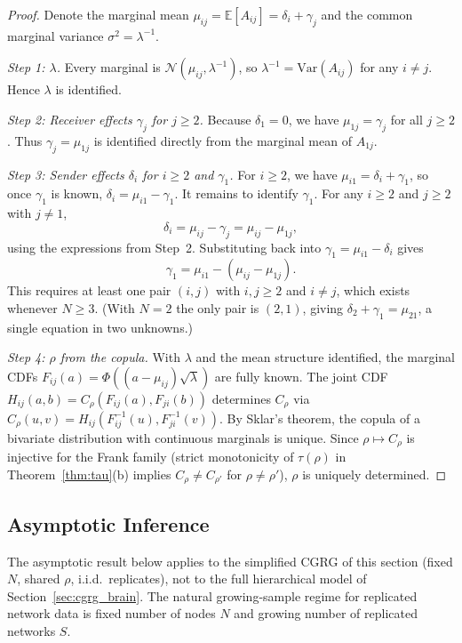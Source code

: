 \documentclass[12pt]{article}
\begin{document}
\begin{proof}
Denote the marginal mean $\mu_{ij} = \mathbb{E}[A_{ij}] = \delta_i +
\gamma_j$ and the common marginal variance $\sigma^2 = \lambda^{-1}$.

\emph{Step 1: $\lambda$.}
Every marginal is $\mathcal{N}(\mu_{ij}, \lambda^{-1})$, so
$\lambda^{-1} = \mathrm{Var}(A_{ij})$ for any $i \neq j$.
Hence $\lambda$ is identified.

\emph{Step 2: Receiver effects $\gamma_j$ for $j \geq 2$.}
Because $\delta_1 = 0$, we have $\mu_{1j} = \gamma_j$ for all $j \geq 2$.
Thus $\gamma_j = \mu_{1j}$ is identified directly from the marginal mean
of $A_{1j}$.

\emph{Step 3: Sender effects $\delta_i$ for $i \geq 2$ and $\gamma_1$.}
For $i \geq 2$, we have $\mu_{i1} = \delta_i + \gamma_1$, so once
$\gamma_1$ is known, $\delta_i = \mu_{i1} - \gamma_1$.  It remains to
identify $\gamma_1$.  For any $i \geq 2$ and $j \geq 2$ with $j \neq 1$,
\[
\delta_i = \mu_{ij} - \gamma_j = \mu_{ij} - \mu_{1j},
\]
using the expressions from Step~2.  Substituting back into
$\gamma_1 = \mu_{i1} - \delta_i$ gives
\[
\gamma_1 = \mu_{i1} - (\mu_{ij} - \mu_{1j}).
\]
This requires at least one pair $(i,j)$ with $i,j \geq 2$ and $i \neq j$,
which exists whenever $N \geq 3$.  (With $N = 2$ the only pair is $(2,1)$,
giving $\delta_2 + \gamma_1 = \mu_{21}$, a single equation in two unknowns.)

\emph{Step 4: $\rho$ from the copula.}
With $\lambda$ and the mean structure identified, the marginal CDFs
$F_{ij}(a) = \Phi((a - \mu_{ij})\sqrt{\lambda})$ are fully known.
The joint CDF $H_{ij}(a,b) = C_\rho(F_{ij}(a), F_{ji}(b))$ determines
$C_\rho$ via $C_\rho(u,v) = H_{ij}(F_{ij}^{-1}(u), F_{ji}^{-1}(v))$.
By Sklar's theorem, the copula of a bivariate distribution with continuous
marginals is unique.  Since $\rho \mapsto C_\rho$ is injective for the
Frank family (strict monotonicity of $\tau(\rho)$ in
Theorem~\ref{thm:tau}(b) implies $C_\rho \neq C_{\rho'}$ for
$\rho \neq \rho'$), $\rho$ is uniquely determined.
\end{proof}

\subsection{Asymptotic Inference}

The asymptotic result below applies to the simplified CGRG of this section
(fixed $N$, shared $\rho$, i.i.d.\ replicates), not to the full hierarchical
model of Section~\ref{sec:cgrg_brain}.  The natural growing-sample regime for
replicated network data is fixed number of nodes $N$ and growing number of
replicated networks $S$.
\end{document}
